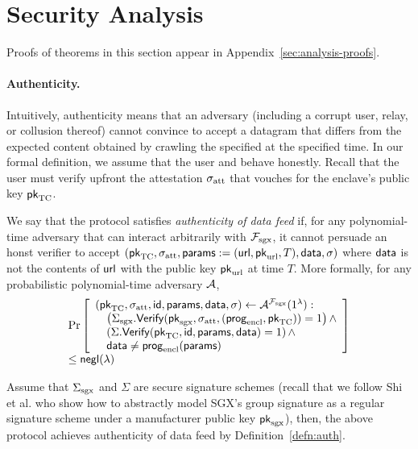 \section{Security Analysis}
\label{sec:analysis}

Proofs of theorems in this section appear in Appendix~\ref{sec:analysis-proofs}.


\paragraph{Authenticity.}
Intuitively, authenticity means that an adversary (including a corrupt user, relay, or collusion thereof)
cannot convince \tcont to accept a datagram that differs from the expected content obtained by crawling the specified \weburl at the specified time.
In our formal definition, we assume that the user and \tcont behave honestly.
Recall that the user must verify upfront the attestation ${\sigma_{\textrm{att}}}$ that vouches for the enclave's public key ${\sf pk}_{\textrm{TC}}$.

\begin{definition}
We say that the \tc protocol satisfies \emph{authenticity of data feed} if,
for any polynomial-time adversary that can interact arbitrarily with $\mathcal{F}_{\textrm{sgx}}$,
it cannot persuade an honst verifier to accept $({\sf pk}_{\textrm{TC}}, {\sigma_{\textrm{att}}}, {\sf params}:=({{\sf url}}, {\sf pk}_{\textrm{url}}, T), {\sf data}, \sigma)$
where ${\sf data}$ is not the contents of ${{\sf url}}$ with the public key ${\sf pk}_{\textrm{url}}$ at time $T$.
More formally, for any probabilistic polynomial-time adversary $\mathcal{A}$,
\[
\begin{array}{l}
\Pr\left[
\begin{array}{l}
({\sf pk}_{\textrm{TC}}, {\sigma_{\textrm{att}}}, {\sf id}, {\sf params}, {\sf data}, \sigma) \leftarrow 
\mathcal{A}^{\mathcal{F}_{\textrm{sgx}}}(1^\lambda) :\\
\quad \left({\Sigma_{\textrm{sgx}}}.{\sf Verify}({\sf pk}_{\mathrm{sgx}}, {\sigma_{\textrm{att}}}, ({\sf prog}_{\textrm{encl}}, {\sf pk}_{\textrm{TC}})) = 1\right) \wedge \\
\quad \left(\Sigma.{\sf Verify}({\sf pk}_{\textrm{TC}}, {\sf id}, {\sf params}, {\sf data})  = 1\right) \wedge\\
\quad {\sf data} \neq {\sf prog}_{\textrm{encl}}({\sf params}) 
\end{array}
\right] \\[3pt] 
\leq {\sf negl}(\lambda)
\end{array}
\]
\label{defn:auth}
\end{definition}


\begin{theorem}[Authenticity]
Assume that ${\Sigma_{\textrm{sgx}}}$
and $\Sigma$ are secure signature schemes (recall
that we follow Shi et al.  who show
how to abstractly  
model SGX's group signature as a regular signature
scheme under a manufacturer public key ${\sf pk}_{\mathrm{sgx}}$),
then, the above 
protocol achieves authenticity of data feed by Definition~\ref{defn:auth}.
\end{theorem}




